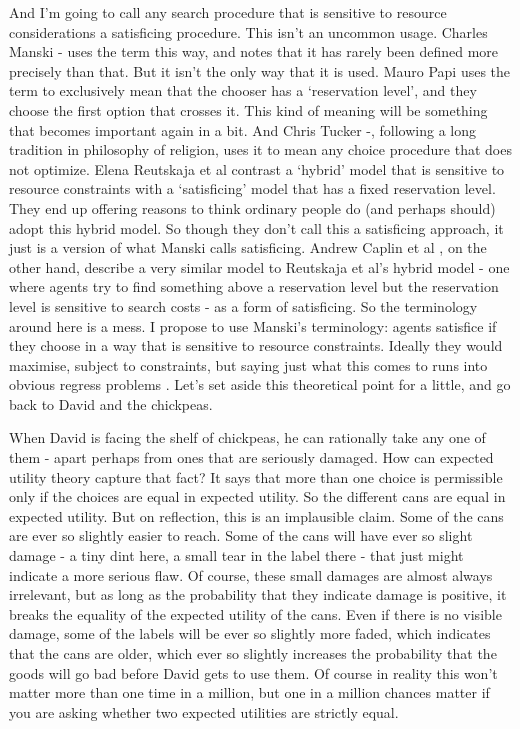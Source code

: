 \documentclass[
  11pt,
]{book}
\begin{document}
And I'm going to call any search procedure that is sensitive to resource considerations a satisficing procedure. This isn't an uncommon usage. Charles Manski -\citet{Manski2017} uses the term this way, and notes that it has rarely been defined more precisely than that. But it isn't the only way that it is used. Mauro Papi \citeyearpar{Papi2013} uses the term to exclusively mean that the chooser has a `reservation level', and they choose the first option that crosses it. This kind of meaning will be something that becomes important again in a bit. And Chris Tucker -\citet{Tucker2016}, following a long tradition in philosophy of religion, uses it to mean any choice procedure that does not optimize. Elena Reutskaja et al \citeyearpar{Reutskaja2011} contrast a `hybrid' model that is sensitive to resource constraints with a `satisficing' model that has a fixed reservation level. They end up offering reasons to think ordinary people do (and perhaps should) adopt this hybrid model. So though they don't call this a satisficing approach, it just is a version of what Manski calls satisficing. Andrew Caplin et al \citeyearpar{Caplin2011}, on the other hand, describe a very similar model to Reutskaja et al's hybrid model - one where agents try to find something above a reservation level but the reservation level is sensitive to search costs - as a form of satisficing. So the terminology around here is a mess. I propose to use Manski's terminology: agents satisfice if they choose in a way that is sensitive to resource constraints. Ideally they would maximise, subject to constraints, but saying just what this comes to runs into obvious regress problems \citep{Savage1967}. Let's set aside this theoretical point for a little, and go back to David and the chickpeas.

When David is facing the shelf of chickpeas, he can rationally take any one of them - apart perhaps from ones that are seriously damaged. How can expected utility theory capture that fact? It says that more than one choice is permissible only if the choices are equal in expected utility. So the different cans are equal in expected utility. But on reflection, this is an implausible claim. Some of the cans are ever so slightly easier to reach. Some of the cans will have ever so slight damage - a tiny dint here, a small tear in the label there - that just might indicate a more serious flaw. Of course, these small damages are almost always irrelevant, but as long as the probability that they indicate damage is positive, it breaks the equality of the expected utility of the cans. Even if there is no visible damage, some of the labels will be ever so slightly more faded, which indicates that the cans are older, which ever so slightly increases the probability that the goods will go bad before David gets to use them. Of course in reality this won't matter more than one time in a million, but one in a million chances matter if you are asking whether two expected utilities are strictly equal.
\end{document}
